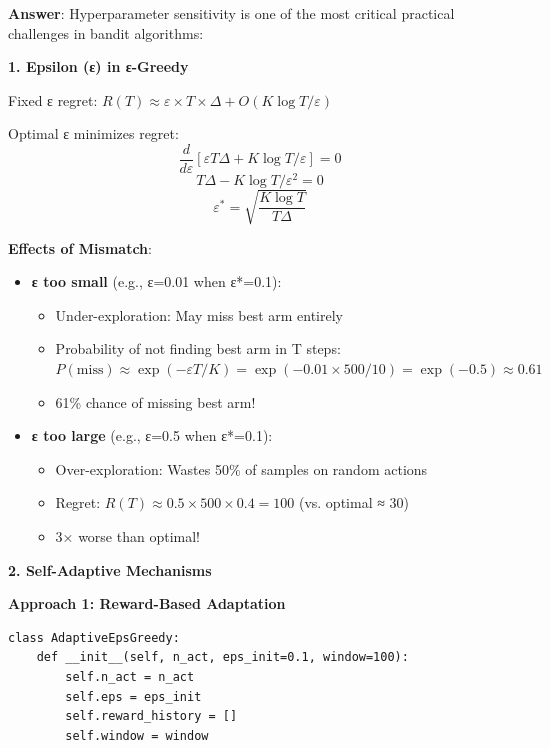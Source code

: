\documentclass[12pt]{article}
\begin{document}
{{{\textbf{Answer}: Hyperparameter sensitivity is one of the most critical practical challenges in bandit algorithms:

\textbf{1. Epsilon (ε) in ε-Greedy}

Fixed ε regret: $R(T) \approx \varepsilon \times T \times \Delta + O(K \log T / \varepsilon)$

Optimal ε minimizes regret:
\begin{equation}
\frac{d}{d\varepsilon} [\varepsilon T \Delta + K \log T / \varepsilon] = 0
\end{equation}
\begin{equation}
T \Delta - K \log T / \varepsilon^2 = 0
\end{equation}
\begin{equation}
\varepsilon^* = \sqrt{\frac{K \log T}{T \Delta}}
\end{equation}

\textbf{Effects of Mismatch}:
\begin{itemize}
\item \textbf{ε too small} (e.g., ε=0.01 when ε*=0.1):
  \begin{itemize}
  \item Under-exploration: May miss best arm entirely
  \item Probability of not finding best arm in T steps: $P(\text{miss}) \approx \exp(-\varepsilon T / K) = \exp(-0.01 \times 500 / 10) = \exp(-0.5) \approx 0.61$
  \item 61\% chance of missing best arm!
  \end{itemize}
\item \textbf{ε too large} (e.g., ε=0.5 when ε*=0.1):
  \begin{itemize}
  \item Over-exploration: Wastes 50\% of samples on random actions
  \item Regret: $R(T) \approx 0.5 \times 500 \times 0.4 = 100$ (vs. optimal ≈ 30)
  \item 3× worse than optimal!
  \end{itemize}
\end{itemize}

\textbf{2. Self-Adaptive Mechanisms}

\textbf{Approach 1: Reward-Based Adaptation}

\begin{verbatim}
class AdaptiveEpsGreedy:
    def __init__(self, n_act, eps_init=0.1, window=100):
        self.n_act = n_act
        self.eps = eps_init
        self.reward_history = []
        self.window = window


\end{verbatim}}}}
\end{document}
